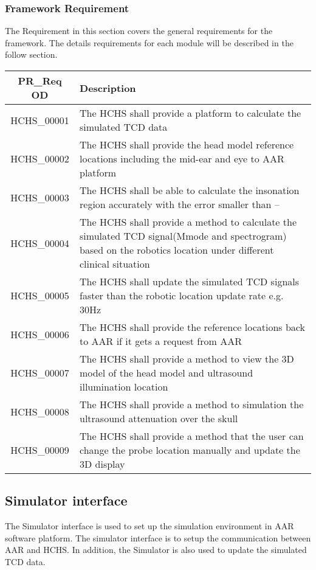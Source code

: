 \documentclass[10pt]{article}
\begin{document}
  \subsubsection{Framework Requirement}
  The Requirement in this section covers the general requirements for the framework. The details requirements for each module will be described in the follow section.

 \begin{tabularx}{\textwidth}{|c|X|}
  \hline
  \textbf{PR\_Req OD} & \textbf{Description}\\ \hline
  
  HCHS\_00001 & The HCHS shall provide a platform to calculate the simulated TCD data \\ \hline
  
  HCHS\_00002 & The HCHS shall provide the head model reference locations including
  the mid-ear and eye to AAR platform\\ \hline
  
  HCHS\_00003 & The HCHS shall be able to calculate the insonation region accurately with the error smaller than \--- \\ \hline
  
  HCHS\_00004 & The HCHS shall provide a method to calculate the simulated TCD signal(Mmode and spectrogram) based on the robotics location under different clinical situation\\ \hline
  
  HCHS\_00005 & The HCHS shall update the simulated TCD signals faster than the robotic location update rate e.g. 30Hz\\ \hline
  
  HCHS\_00006 & The HCHS shall provide the reference locations back to AAR if it gets a request from AAR\\ \hline
  
  HCHS\_00007 & The HCHS shall provide a method to view the 3D model of the head model and ultrasound illumination location\\ \hline
  
  HCHS\_00008 & The HCHS shall provide a method to simulation the ultrasound attenuation over the skull\\ \hline
  
  HCHS\_00009 & The HCHS shall provide a method that the user can change the probe location manually and update the 3D display \\ \hline
  
 \end{tabularx}
 \subsection{Simulator interface}
  The Simulator interface is used to set up the simulation environment in AAR software platform. The simulator interface is to setup the communication between AAR and HCHS. In addition, the Simulator is also used to update the simulated TCD data. 
\end{document}
